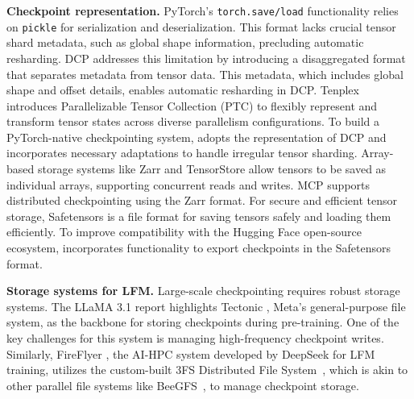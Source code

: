 \noindent \textbf{Checkpoint representation.}
PyTorch's \texttt{torch.save/load} functionality relies on \texttt{pickle} for serialization and deserialization.
This format lacks crucial tensor shard metadata, such as global shape information, precluding automatic resharding.
DCP \cite{torch-dcp} addresses this limitation by introducing a disaggregated format that separates metadata from tensor data. This metadata, which includes global shape and offset details, enables automatic resharding in DCP.
Tenplex~\cite{tenplex} introduces Parallelizable Tensor Collection (PTC) to flexibly represent and transform tensor states across diverse parallelism configurations.
To build a PyTorch-native checkpointing system, \sys{} adopts the representation of DCP and incorporates necessary adaptations to handle irregular tensor sharding.
Array-based storage systems like Zarr \cite{zarrZarr} and TensorStore \cite{googleTensorStore} allow tensors to be saved as individual arrays, supporting concurrent reads and writes. MCP \cite{megatron-dcp} supports distributed checkpointing using the Zarr format.
For secure and efficient tensor storage, Safetensors \cite{huggingfaceSafetensors} is a file format for saving tensors safely and loading them efficiently.
To improve compatibility with the Hugging Face open-source ecosystem, \sys{} incorporates functionality to export checkpoints in the Safetensors format.

\noindent \textbf{Storage systems for LFM.}
Large-scale checkpointing requires robust storage systems. The LLaMA 3.1 report \cite{llama3.1} highlights Tectonic \cite{tectonic}, Meta's general-purpose file system, as the backbone for storing checkpoints during pre-training. One of the key challenges for this system is managing high-frequency checkpoint writes. Similarly, FireFlyer \cite{fireflyer}, the AI-HPC system developed by DeepSeek \cite{deepseekai,deepseek-v3,deepseek-r1} for LFM training, utilizes the custom-built 3FS Distributed File System~\cite{3fs}, which is akin to other parallel file systems like BeeGFS~\cite{herold2014introduction}, to manage checkpoint storage. %

